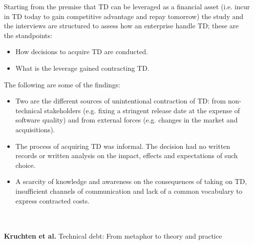 Starting from the premise that TD can be leveraged as a financial asset (i.e. incur in TD today to gain competitive advantage and repay tomorrow) the study and the interviews are structured to assess how an enterprise handle TD; these are the standpoints:
\begin{itemize}
    \item How decisions to acquire TD are conducted.
    \item What is the leverage gained contracting TD.
\end{itemize}
The following are some of the findings:
\begin{itemize}
    \item Two are the different sources of unintentional contraction of TD: from non-technical stakeholders (e.g. fixing a stringent release date at the expense of software quality) and from external forces (e.g. changes in the market and acquisitions).
    \item The process of acquiring TD was informal. The decision had no written records or written analysis on the impact, effects and expectations of such choice.
    \item A scarcity of knowledge and awareness on the consequences of taking on TD, insufficient channels of communication and lack of a common vocabulary to express contracted costs. 
\end{itemize}
\\
\\
\textbf{Kruchten et al.} \cite{kruchten2012technical} Technical debt: From metaphor to theory and practice


